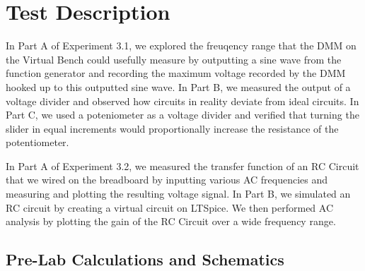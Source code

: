 \documentclass[10pt]{article}
\begin{document}
\medskip


\section{Test Description}
In Part A of Experiment 3.1, we explored the freuqency range that the DMM on the Virtual Bench could usefully measure by outputting a sine wave from the function generator and recording the maximum voltage recorded by the DMM hooked up to this outputted sine wave. In Part B, we measured the output of a voltage divider and observed how circuits in reality deviate from ideal circuits. In Part C, we used a poteniometer as a voltage divider and verified that turning the slider in equal increments would proportionally increase the resistance of the potentiometer. 

In Part A of Experiment 3.2, we measured the transfer function of an RC Circuit that we wired on the breadboard by inputting various AC frequencies and measuring and plotting the resulting voltage signal. In Part B, we simulated an RC circuit by creating a virtual circuit on LTSpice. We then performed AC analysis by plotting the gain of the RC Circuit over a wide frequency range.  


\medskip


\subsection{Pre-Lab Calculations and Schematics}
\end{document}
